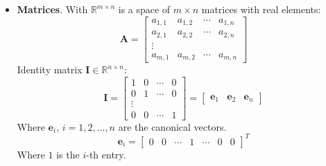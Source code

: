 \begin{itemize}
	\item \textbf{Matrices}. With $\mathbb{R}^{m \times n}$ is a space of $m \times n$ matrices with real elements:
	\begin{equation*}
		\mathbf{A} = \begin{bmatrix}
			a_{1,1} & a_{1,2} & \cdots & a_{1,n} \\
			a_{2,1} & a_{2,2} & \cdots & a_{2,n} \\
			\vdots &  &  &  \\
			a_{m,1} & a_{m,2} & \cdots & a_{m,n}
		\end{bmatrix}
	\end{equation*}
	Identity matrix $\mathbf{I} \in \mathbb{R}^{n \times n}$:
	\begin{equation*}
		\mathbf{I} = \begin{bmatrix}
			1 & 0 & \cdots & 0 \\
			0 & 1 & \cdots & 0 \\
			\vdots &&& \\
			0 & 0 & \cdots & 1
		\end{bmatrix}
		=
		\begin{bmatrix}
			\mathbf{e}_{1} & \mathbf{e}_{2} & \mathbf{e}_{n}
		\end{bmatrix}
	\end{equation*}
	Where $\mathbf{e}_{i}$, $i = 1, 2, \dots, n$ are the canonical vectors.
	\begin{equation*}
		\mathbf{e}_{i} = \begin{bmatrix}
			0 & 0 & \cdots & 1 & \cdots & 0 & 0
		\end{bmatrix}^{T}
	\end{equation*}
	Where $1$ is the $i$-th entry.
\end{itemize}